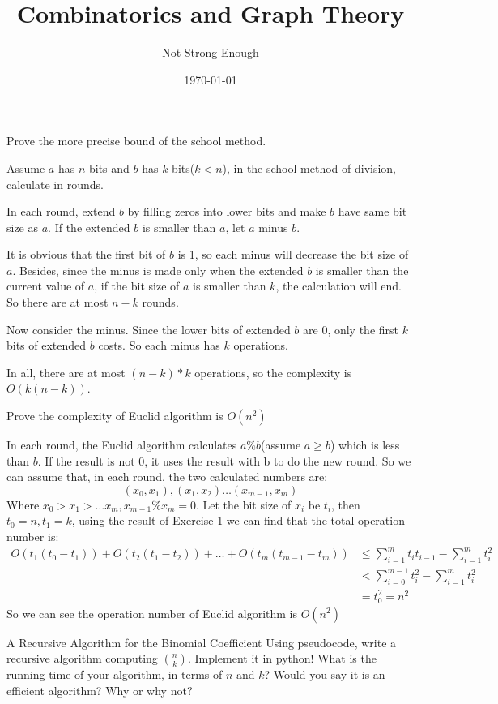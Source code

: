 \documentclass[UTF8, a4paper, linespread=1.5]{article}
\title{Combinatorics and Graph Theory}
\date{\today}
\author{Not Strong Enough}
\begin{document}
\maketitle

\begin{thm}{}{}
    Prove the more precise bound of the school method.
\end{thm}

Assume $a$ has $n$ bits and $b$ has $k$ bits($k < n$), in the school method of division, 
calculate in rounds. 

In each round, extend $b$ by filling zeros into lower bits and make $b$ have same bit size as $a$. 
If the extended $b$ is smaller than $a$, let $a$ minus $b$. 

It is obvious that the first bit of $b$ is 1, so each minus will decrease the bit size of $a$. 
Besides, since the minus is made only when the extended $b$ is smaller than the current value of $a$, 
if the bit size of $a$ is smaller than $k$, the calculation will end. 
So there are at most $n-k$ rounds. 

Now consider the minus. Since the lower bits of extended $b$ are 0, only the first $k$ bits of extended $b$ 
costs. So each minus has $k$ operations. 

In all, there are at most $(n-k)*k$ operations, so the complexity is $O(k(n-k))$. 

\begin{thm}{}{}
    Prove the complexity of Euclid algorithm is $O(n^2)$
\end{thm}

In each round, the Euclid algorithm calculates $a\%b$(assume $a\geq b$) which is less than $b$. 
If the result is not 0, it uses the result with b to do the new round. So we can assume that, in each round, 
the two calculated numbers are: 
$$(x_0, x_1), (x_1, x_2)\dots (x_{m-1}, x_m)$$
Where $x_0>x_1>\dots x_m, x_{m-1}\%x_m=0$. 
Let the bit size of $x_i$ be $t_i$, then $t_0=n, t_1=k$, 
using the result of Exercise 1 we can find that the total operation number is: 
\begin{align}
O(t_1(t_0-t_1))+O(t_2(t_1-t_2))+\dots + O(t_m(t_{m-1}-t_m)) &\leq\sum_{i=1}^m t_i t_{i-1}-\sum_{i=1}^m t_i^2\\
&<\sum_{i=0}^{m-1} t_i^2 -\sum_{i=1}^m t_i^2\\
&=t_0^2=n^2
\end{align}
So we can see the operation number of Euclid algorithm is $O(n^2)$

\begin{thm}{A Recursive Algorithm for the Binomial Coefficient}{}
   Using pseudocode, write a recursive algorithm computing
  ${n \choose k}$. Implement it in python! What is 
  the running time of your algorithm, in terms of $n$ and $k$? Would you say it is an efficient
  algorithm? Why or why not?
\end{thm}
\end{document}
